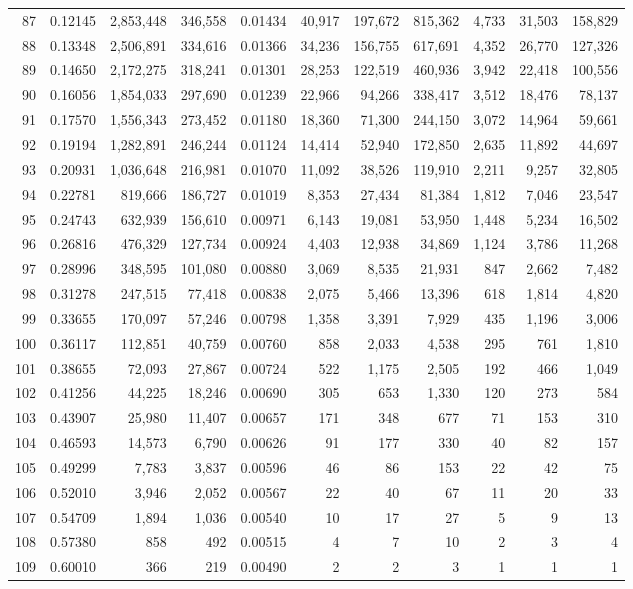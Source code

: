 \begin{landscape}
\begin{longtable}{rrrrrrrrrrr}
87 & 0.12145 & 2,853,448 & 346,558 & 0.01434 & 40,917 & 197,672 & 815,362 & 4,733 & 31,503 & 158,829 \\
88 & 0.13348 & 2,506,891 & 334,616 & 0.01366 & 34,236 & 156,755 & 617,691 & 4,352 & 26,770 & 127,326 \\
89 & 0.14650 & 2,172,275 & 318,241 & 0.01301 & 28,253 & 122,519 & 460,936 & 3,942 & 22,418 & 100,556 \\
90 & 0.16056 & 1,854,033 & 297,690 & 0.01239 & 22,966 & 94,266 & 338,417 & 3,512 & 18,476 & 78,137 \\
91 & 0.17570 & 1,556,343 & 273,452 & 0.01180 & 18,360 & 71,300 & 244,150 & 3,072 & 14,964 & 59,661 \\
92 & 0.19194 & 1,282,891 & 246,244 & 0.01124 & 14,414 & 52,940 & 172,850 & 2,635 & 11,892 & 44,697 \\
93 & 0.20931 & 1,036,648 & 216,981 & 0.01070 & 11,092 & 38,526 & 119,910 & 2,211 & 9,257 & 32,805 \\
94 & 0.22781 & 819,666 & 186,727 & 0.01019 & 8,353 & 27,434 & 81,384 & 1,812 & 7,046 & 23,547 \\
95 & 0.24743 & 632,939 & 156,610 & 0.00971 & 6,143 & 19,081 & 53,950 & 1,448 & 5,234 & 16,502 \\
96 & 0.26816 & 476,329 & 127,734 & 0.00924 & 4,403 & 12,938 & 34,869 & 1,124 & 3,786 & 11,268 \\
97 & 0.28996 & 348,595 & 101,080 & 0.00880 & 3,069 & 8,535 & 21,931 & 847 & 2,662 & 7,482 \\
98 & 0.31278 & 247,515 & 77,418 & 0.00838 & 2,075 & 5,466 & 13,396 & 618 & 1,814 & 4,820 \\
99 & 0.33655 & 170,097 & 57,246 & 0.00798 & 1,358 & 3,391 & 7,929 & 435 & 1,196 & 3,006 \\
100 & 0.36117 & 112,851 & 40,759 & 0.00760 & 858 & 2,033 & 4,538 & 295 & 761 & 1,810 \\
101 & 0.38655 & 72,093 & 27,867 & 0.00724 & 522 & 1,175 & 2,505 & 192 & 466 & 1,049 \\
102 & 0.41256 & 44,225 & 18,246 & 0.00690 & 305 & 653 & 1,330 & 120 & 273 & 584 \\
103 & 0.43907 & 25,980 & 11,407 & 0.00657 & 171 & 348 & 677 & 71 & 153 & 310 \\
104 & 0.46593 & 14,573 & 6,790 & 0.00626 & 91 & 177 & 330 & 40 & 82 & 157 \\
105 & 0.49299 & 7,783 & 3,837 & 0.00596 & 46 & 86 & 153 & 22 & 42 & 75 \\
106 & 0.52010 & 3,946 & 2,052 & 0.00567 & 22 & 40 & 67 & 11 & 20 & 33 \\
107 & 0.54709 & 1,894 & 1,036 & 0.00540 & 10 & 17 & 27 & 5 & 9 & 13 \\
108 & 0.57380 & 858 & 492 & 0.00515 & 4 & 7 & 10 & 2 & 3 & 4 \\
109 & 0.60010 & 366 & 219 & 0.00490 & 2 & 2 & 3 & 1 & 1 & 1 \\
\end{longtable}
\end{landscape}
